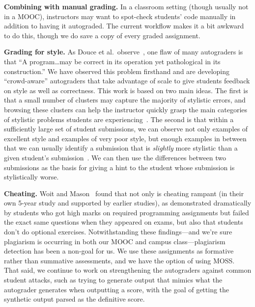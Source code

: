 \textbf{Combining with manual grading.}  In a classroom setting (though
usually not in a MOOC), instructors may want to
spot-check students' code manually  in addition to having it
autograded.  The current workflow makes it a  bit awkward to do this,
though we do save a copy of every graded assignment.

\textbf{Grading for style.}
As Douce et al.\ observe~\cite{douce-2005-autograding-survey}, one flaw
of many autograders is that ``A program\ldots{}may be correct in its
operation yet pathological in its construction.''
We have observed this problem firsthand and are developing
``crowd-aware'' 
autograders that take advantage of
scale to give students feedback on style as well as correctness.
This work is based
on two main ideas.
The first is that a small number of clusters may capture the
majority of stylistic errors, and browsing these clusters can help 
the instructor quickly grasp the main categories of stylistic problems students
are experiencing~\cite{clustering-style}.  The second is that within a sufficiently large set of
student submissions, we can observe not only examples of excellent style and
examples of very poor style, but enough examples in between that we can
usually identify a submission that is \emph{slightly} more stylistic
than a given student's submission~\cite{autostyle}.  We can then use the differences
between two submissions as the basis for giving a hint to the student
whose submission is stylistically worse.

\textbf{Cheating.}
Woit and Mason~\cite{woit2003} found that not only is cheating rampant
(in their own 5-year study and supported by earlier studies), as
demonstrated dramatically by students who got high marks on required
programming assignments but failed the exact same questions when they
appeared on exams, but also that students don't do optional exercises.
Notwithstanding these findings---and we're sure plagiarism is occurring
in both our MOOC and campus class---plagiarism detection has been a
non-goal for us.
We use these assignments as formative rather than summative assessments,
and we have the option of using
MOSS.
That said, we continue to work on strengthening the autograders against
common student attacks, such as trying to generate output that mimics
what the autograder generates when outputting a score, with the goal of
getting the synthetic output parsed as the definitive score.



